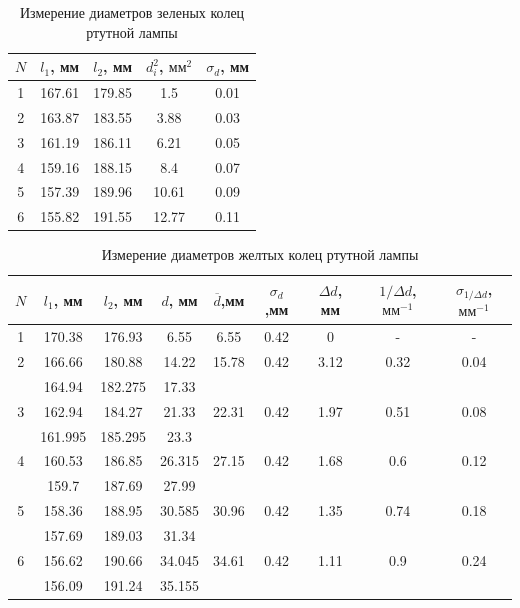 \documentclass[12pt]{kiarticle}
\begin{document}
			\begin{table}[]
			\caption{Измерение диаметров зеленых колец ртутной лампы}
			\begin{center}
				\begin{tabular}{|c|c|c|c|c|}
					\hline
					$ N $ & $ l_1 $, мм & $ l_2 $, мм & $ d_i^2 $, $ мм^2 $ & $ \sigma_d $, мм\\
					\hline
					 1 & 167.61 & 179.85 & 1.5 & 0.01 \\
					2 & 163.87 & 183.55 & 3.88 & 0.03 \\
					3 & 161.19 & 186.11 & 6.21 & 0.05 \\
					4 & 159.16 & 188.15 & 8.4 & 0.07 \\
					5 & 157.39 & 189.96 & 10.61 & 0.09 \\
					6 & 155.82 & 191.55 & 12.77 & 0.11 \\
					\hline
				\end{tabular}
			\end{center}
			\label{Gr_table}
		\end{table}
	
	\begin{table}[]
		\caption{Измерение диаметров желтых колец ртутной лампы}
		\begin{center}
			\begin{tabular}{|c|c|c|c|c|c|c|c|c|}
				\hline
					$ N $ & $ l_1 $, мм & $ l_2 $, мм & $ d $, мм & $ \overline{d} $,мм &  $ \sigma_d $,мм & $ \Delta d $, мм  &  $ 1/\Delta d $,$ мм^{-1} $ & $ \sigma_{1/\Delta d} $,$ мм^{-1} $\\
					\hline
			1 & 170.38 & 176.93 & 6.55 & 6.55 & 0.42 & 0 & - & - \\
			2 & 166.66 & 180.88 & 14.22 & 15.78 & 0.42 & 3.12 & 0.32 & 0.04 \\
			\text{} & 164.94 & 182.275 & 17.33 & \text{} & \text{} & \text{} & \text{} & \text{} \\
			
			3 & 162.94 & 184.27 & 21.33 & 22.31 & 0.42 & 1.97 & 0.51 & 0.08 \\
			\text{} & 161.995 & 185.295 & 23.3 & \text{} & \text{} & \text{} & \text{} & \text{} \\
			4 & 160.53 & 186.85 & 26.315 & 27.15 & 0.42 & 1.68 & 0.6 & 0.12 \\
			\text{} & 159.7 & 187.69 & 27.99 & \text{} & \text{} & \text{} & \text{} & \text{} \\
			5 & 158.36 & 188.95 & 30.585 & 30.96 & 0.42 & 1.35 & 0.74 & 0.18 \\
			\text{} & 157.69 & 189.03 & 31.34 & \text{} & \text{} & \text{} & \text{} & \text{} \\
			6 & 156.62 & 190.66 & 34.045 & 34.61 & 0.42 & 1.11 & 0.9 & 0.24 \\
			\text{} & 156.09 & 191.24 & 35.155 & \text{} & \text{} & \text{} & \text{} & \text{} \\
				\hline
			\end{tabular}
		\end{center}
		\label{Ye_table}
	\end{table}
\end{document}
